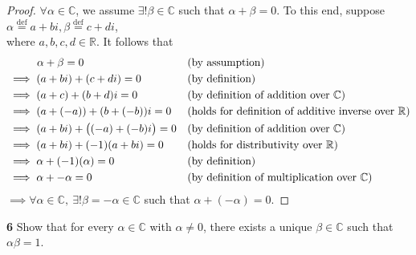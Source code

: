 \documentclass{article}
\begin{document}
\begin{proof}
    $\forall \alpha \in \mathbb{C}$, we assume $\exists! \beta \in \mathbb{C}$ such that $\alpha + \beta = 0$. To this end, suppose $\alpha \stackrel{\text{def}}{=} a + bi, \beta \stackrel{\text{def}}{=} c + di$, \\
    \indent where $a,b,c,d \in \mathbb{R}$. It follows that
    \begin{align*}
        &\hspace{9.75 mm} \alpha + \beta = 0 &&\text{(by assumption)}\\
        &\implies (a + bi) + (c + di) = 0 &&\text{(by definition)}\\
        &\implies (a + c) + (b + d)i = 0 &&\text{(by definition of addition over $\mathbb{C}$)}\\
        &\implies (a + (-a)) + (b + (-b))i = 0 &&\text{(holds for definition of additive inverse over $\mathbb{R}$)}\\
        &\implies (a + bi) + \big((-a) + (-b)i\big) = 0 &&\text{(by definition of addition over $\mathbb{C}$)}\\
        &\implies (a + bi) + (-1)(a + bi) = 0 &&\text{(holds for distributivity over $\mathbb{R}$)}\\
        &\implies \alpha + (-1)(\alpha) = 0 &&\text{(by definition)}\\
        &\implies \alpha + -\alpha = 0 &&\text{(by definition of multiplication over $\mathbb{C}$)}\\
    \end{align*}
    $\implies \forall \alpha \in \mathbb{C}, \ \exists! \beta = -\alpha \in \mathbb{C}$ such that $\alpha + (-\alpha) = 0$.

\end{proof}
\color{black}

\noindent \textbf{6} \hspace{3 mm} Show that for every $\alpha \in \mathbb{C}$ with $\alpha \neq 0$, there exists a unique $\beta \in \mathbb{C}$ such that $\alpha\beta = 1$. \color{red}
\end{document}
